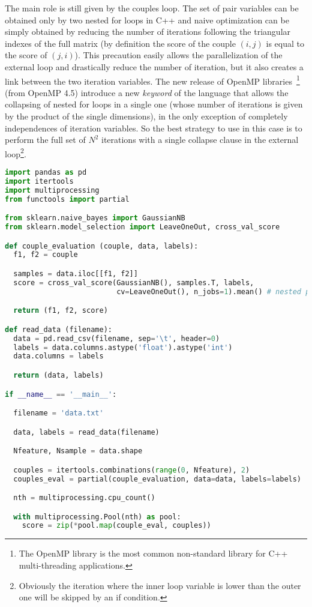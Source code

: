 \documentclass{standalone}
\begin{document}
The main role is still given by the couples loop.
The set of pair variables can be obtained only by two nested for loops in \textsf{C++} and naive optimization can be simply obtained by reducing the number of iterations following the triangular indexes of the full matrix (by definition the score of the couple $(i, j)$ is equal to the score of $(j, i)$).
This precaution easily allows the parallelization of the external loop and drastically reduce the number of iteration, but it also creates a link between the two iteration variables.
The new release of OpenMP libraries~\cite{OpenMP}\footnote{
  The OpenMP library is the most common non-standard library for \textsf{C++} multi-threading applications.
} (from OpenMP 4.5) introduce a new \emph{keyword} of the language that allows the collapsing of nested for loops in a single one (whose number of iterations is given by the product of the single dimensions), in the only exception of completely independences of iteration variables.
So the best strategy to use in this case is to perform the full set of $N^2$ iterations with a single \textsf{collapse} clause in the external loop\footnote{
  Obviously the iteration where the inner loop variable is lower than the outer one will be skipped by an if condition.
}.

\lstset{style=snippet}
\begin{lstlisting}[language=Python, caption=Python parallel couples evaluation algorithm, label=code:py_couples]
import pandas as pd
import itertools
import multiprocessing
from functools import partial

from sklearn.naive_bayes import GaussianNB
from sklearn.model_selection import LeaveOneOut, cross_val_score

def couple_evaluation (couple, data, labels):
  f1, f2 = couple

  samples = data.iloc[[f1, f2]]
  score = cross_val_score(GaussianNB(), samples.T, labels,
                          cv=LeaveOneOut(), n_jobs=1).mean() # nested parallel loops are not allowed

  return (f1, f2, score)

def read_data (filename):
  data = pd.read_csv(filename, sep='\t', header=0)
  labels = data.columns.astype('float').astype('int')
  data.columns = labels

  return (data, labels)

if __name__ == '__main__':

  filename = 'data.txt'

  data, labels = read_data(filename)

  Nfeature, Nsample = data.shape

  couples = itertools.combinations(range(0, Nfeature), 2)
  couples_eval = partial(couple_evaluation, data=data, labels=labels)

  nth = multiprocessing.cpu_count()

  with multiprocessing.Pool(nth) as pool:
    score = zip(*pool.map(couple_eval, couples))

\end{lstlisting}
\end{document}
